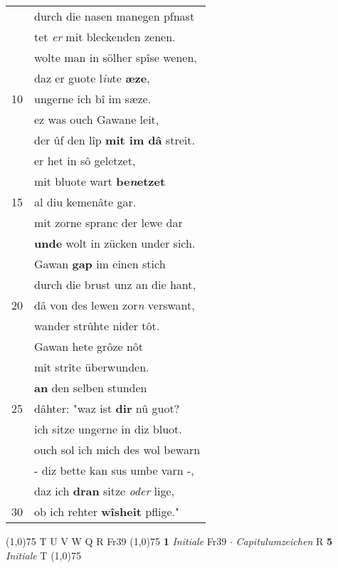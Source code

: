 \documentclass[8pt,a4paper,notitlepage]{article}
\begin{document}
\begin{table}[ht]
\begin{minipage}[t]{0.5\linewidth}
\begin{tabular}{rl}
 & durch die nasen manegen pfnast\\ 
 & tet \textit{er} mit bleckenden zenen.\\ 
 & wolte man in sölher spîse wenen,\\ 
 & daz er guote l\textit{iu}te \textbf{æze},\\ 
10 & ungerne ich bî im sæze.\\ 
 & ez was ouch Gawane leit,\\ 
 & der ûf den lîp \textbf{mit im dâ} streit.\\ 
 & er het in sô geletzet,\\ 
 & mit bluote wart \textbf{be\textit{n}etzet}\\ 
15 & al diu kemenâte gar.\\ 
 & mit zorne spranc der lewe dar\\ 
 & \textbf{unde} wolt in zücken under sich.\\ 
 & Gawan \textbf{gap} im einen stich\\ 
 & durch die brust unz an die hant,\\ 
20 & dâ von des lewen zor\textit{n} verswant,\\ 
 & wander strûhte nider tôt.\\ 
 & Gawan hete grôze nôt\\ 
 & mit strîte überwunden.\\ 
 & \textbf{an} den selben stunden\\ 
25 & dâhter: "waz ist \textbf{dir} nû guot?\\ 
 & ich sitze ungerne in diz bluot.\\ 
 & ouch sol ich mich des wol bewarn\\ 
 & - diz bette kan sus umbe varn -,\\ 
 & daz ich \textbf{dran} sitze \textit{oder} lige,\\ 
30 & ob ich rehter \textbf{wîsheit} pflige."\\ 
\end{tabular}
\scriptsize
\line(1,0){75} \newline
T U V W Q R Fr39 \newline
\line(1,0){75} \newline
\textbf{1} \textit{Initiale} Fr39   $\cdot$ \textit{Capitulumzeichen} R  \textbf{5} \textit{Initiale} T  \newline
\line(1,0){75} \newline

\end{minipage}
\end{table}
\end{document}
